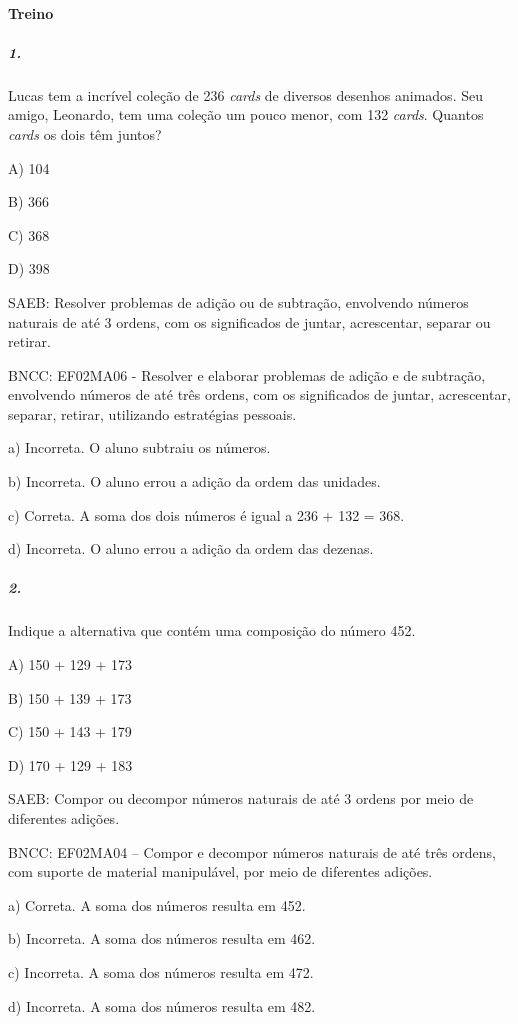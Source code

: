 \paragraph{Treino}\label{treino-1}

\subparagraph{1.}\label{section-25}

Lucas tem a incrível coleção de 236 \emph{cards} de diversos desenhos
animados. Seu amigo, Leonardo, tem uma coleção um pouco menor, com 132
\emph{cards}. Quantos \emph{cards} os dois têm juntos?

A) 104

B) 366

C) 368

D) 398

SAEB: Resolver problemas de adição ou de subtração, envolvendo
números naturais de até 3 ordens, com os significados de juntar,
acrescentar, separar ou retirar.

BNCC: EF02MA06 - Resolver e elaborar problemas de adição e de subtração, envolvendo números de até três ordens, com os significados de juntar, acrescentar, separar,
retirar, utilizando estratégias pessoais.

a) Incorreta. O aluno subtraiu os números.

b) Incorreta. O aluno errou a adição da ordem das unidades.

c) Correta. A soma dos dois números é igual a 236 + 132 = 368.

d) Incorreta. O aluno errou a adição da ordem das dezenas.

\subparagraph{2. }\label{section-26}

Indique a alternativa que contém uma composição do número 452.

A) 150 + 129 + 173

B) 150 + 139 + 173

C) 150 + 143 + 179

D) 170 + 129 + 183

SAEB: Compor ou decompor números naturais de até 3 ordens por
meio de diferentes adições.

BNCC: EF02MA04 -- Compor e decompor números naturais de até três ordens,
com suporte de material manipulável, por meio de diferentes adições.

a) Correta. A soma dos números resulta em 452.

b) Incorreta. A soma dos números resulta em 462.

c) Incorreta. A soma dos números resulta em 472.

d) Incorreta. A soma dos números resulta em 482.

